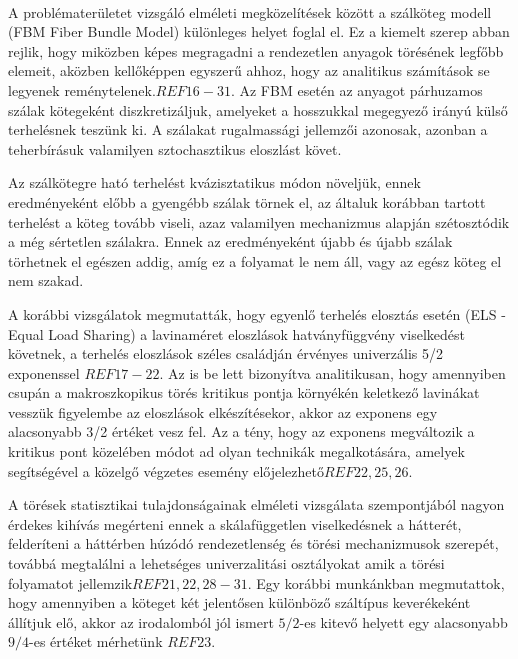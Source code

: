 \\ A problématerületet vizsgáló elméleti megközelítések között a szálköteg modell (FBM Fiber Bundle Model) különleges helyet foglal el. Ez a kiemelt szerep abban rejlik, hogy miközben képes megragadni a rendezetlen anyagok törésének legfőbb elemeit, aközben kellőképpen egyszerű ahhoz, hogy az analitikus számítások se legyenek reménytelenek.$REF16-31$.
Az FBM esetén az anyagot párhuzamos szálak kötegeként diszkretizáljuk, amelyeket a hosszukkal megegyező irányú külső terhelésnek teszünk ki. A szálakat rugalmassági jellemzői azonosak, azonban a teherbírásuk valamilyen sztochasztikus eloszlást követ. 

Az szálkötegre ható terhelést kvázisztatikus módon növeljük, ennek eredményeként előbb a gyengébb szálak törnek el, az általuk korábban tartott terhelést a köteg tovább viseli, azaz valamilyen mechanizmus alapján szétosztódik a még sértetlen szálakra. Ennek az eredményeként újabb és újabb szálak törhetnek el egészen addig, amíg ez a folyamat le nem áll, vagy az egész köteg el nem szakad. 

A korábbi vizsgálatok megmutatták, hogy egyenlő terhelés elosztás esetén (ELS - Equal Load Sharing) a lavinaméret eloszlások hatványfüggvény viselkedést követnek, a terhelés eloszlások széles családján érvényes univerzális 5/2 exponenssel $REF17-22$. Az is be lett bizonyítva analitikusan, hogy amennyiben csupán a makroszkopikus törés kritikus pontja környékén keletkező lavinákat vesszük figyelembe az eloszlások elkészítésekor, akkor az exponens egy alacsonyabb 3/2 értéket vesz fel. Az a tény, hogy az exponens megváltozik a kritikus pont közelében módot ad olyan technikák megalkotására, amelyek segítségével a közelgő végzetes esemény előjelezhető$REF22,25,26$.

A törések statisztikai tulajdonságainak elméleti vizsgálata szempontjából nagyon érdekes kihívás megérteni ennek a skálafüggetlen viselkedésnek a hátterét, felderíteni a háttérben húzódó rendezetlenség és törési mechanizmusok szerepét, továbbá megtalálni a lehetséges univerzalitási osztályokat amik a törési folyamatot jellemzik$REF21,22,28-31$.
Egy korábbi munkánkban megmutattok, hogy amennyiben a köteget két jelentősen különböző száltípus keverékeként állítjuk elő, akkor az irodalomból jól ismert $5/2$-es kitevő helyett egy alacsonyabb $9/4$-es értéket mérhetünk  $REF23$.

